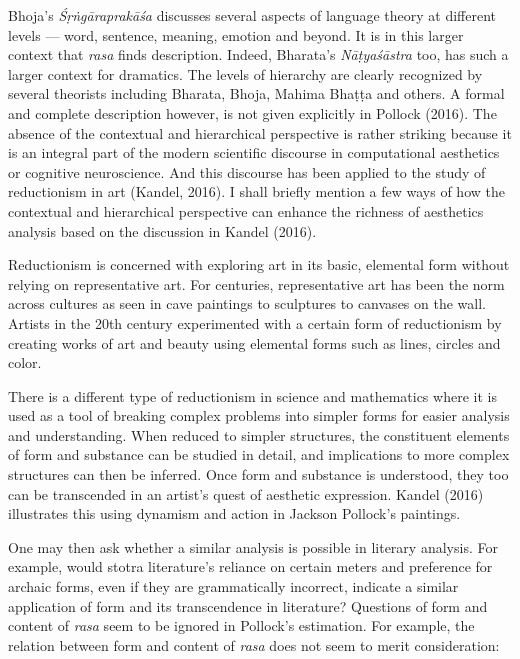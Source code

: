 Bhoja’s \textsl{Śṛṅgāraprakāśa} discusses several aspects of language theory at different levels --- word, sentence, meaning, emotion and beyond. It is in this larger context that \textsl{rasa} finds description. Indeed, Bharata’s \textsl{Nāṭyaśāstra} too, has such a larger context for dramatics. The levels of hierarchy are clearly recognized by several theorists including Bharata, Bhoja, Mahima Bhaṭṭa and others. A formal and complete description however, is not given explicitly in Pollock (2016). The absence of the contextual and hierarchical perspective is rather striking because it is an integral part of the modern scientific discourse in computational aesthetics or cognitive neuroscience. And this discourse has been applied to the study of reductionism in art (Kandel, 2016). I shall briefly mention a few ways of how the contextual and hierarchical perspective can enhance the richness of aesthetics analysis based on the discussion in Kandel (2016).

Reductionism is concerned with exploring art in its basic, elemental form without relying on representative art. For centuries, representative art has been the norm across cultures as seen in cave paintings to sculptures to canvases on the wall. Artists in the 20th century experimented with a certain form of reductionism by creating works of art and beauty using elemental forms such as lines, circles and color. 

There is a different type of reductionism in science and mathematics where it is used as a tool of breaking complex problems into simpler forms for easier analysis and understanding. When reduced to simpler structures, the constituent elements of form and substance can be studied in detail, and implications to more complex structures can then be inferred. Once form and substance is understood, they too can be transcended in an artist’s quest of aesthetic expression. Kandel (2016) illustrates this using dynamism and action in Jackson Pollock’s paintings. 

One may then ask whether a similar analysis is possible in literary analysis. For example, would stotra literature’s reliance on certain meters and preference for archaic forms, even if they are grammatically incorrect, indicate a similar application of form and its transcendence in literature? Questions of form and content of \textsl{rasa} seem to be ignored in Pollock’s estimation. For example, the relation between form and content of \textsl{rasa} does not seem to merit consideration:

